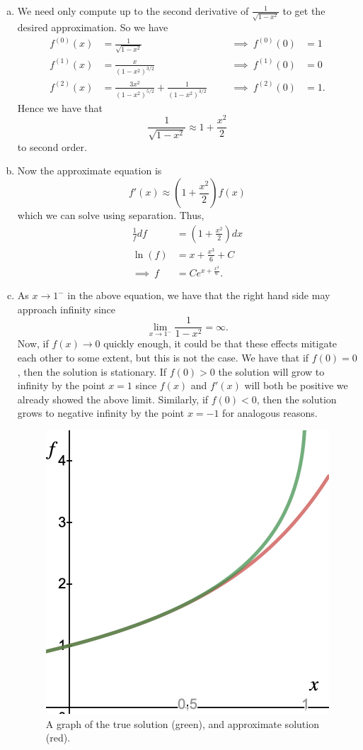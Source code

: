 \documentclass[12pt]{article} %
\begin{document}
\begin{solution}~
\begin{enumerate}[(a)]
    \item We need only compute up to the second derivative of $\frac{1}{\sqrt{1-x^2}}$ to get the desired approximation.  So we have
    \begin{align*}
        f^{(0)}(x)&= \frac{1}{\sqrt{1-x^2}} &&& \implies ~f^{(0)}(0)&=1\\
        f^{(1)}(x)&= \frac{x}{\left(1-x^2\right)^{3/2}} &&& \implies~ f^{(1)}(0)&=0\\
        f^{(2)}(x)&= \frac{3x^2}{\left(1-x^2\right)^{5/2}} + \frac{1}{\left(1-x^2\right)^{3/2}} &&& \implies ~f^{(2)}(0)&=1.
    \end{align*}
    Hence we have that
    \[
    \frac{1}{\sqrt{1-x^2}} \approx 1+\frac{x^2}{2}
    \]
    to second order.
    \item Now the approximate equation is
    \[
    f'(x)\approx \left(1+\frac{x^2}{2}\right)f(x)
    \]
    which we can solve using separation.  Thus,
    \begin{align*}
        \frac{1}{f}df&=\left(1+\frac{x^2}{2}\right)dx\\
        \ln(f)&= x+\frac{x^3}{6}+C\\
        \implies ~ f&= Ce^{x+\frac{x^3}{6}}.
    \end{align*}
    \item As $x\to 1^-$ in the above equation, we have that the right hand side may approach infinity since 
    \[
    \lim_{x\to 1^-} \frac{1}{1-x^2}=\infty.
    \]
    Now, if $f(x)\to 0$ quickly enough, it could be that these effects mitigate each other to some extent, but this is not the case.  We have that if $f(0)=0$, then the solution is stationary. If $f(0)>0$ the solution will grow to infinity by the point $x=1$ since $f(x)$ and $f'(x)$ will both be positive we already showed the above limit.  Similarly, if $f(0)<0$, then the solution grows to negative infinity by the point $x=-1$ for analogous reasons.  
    \begin{figure}[H]
        \centering
        \includegraphics[width=.5\textwidth]{desmos-graph.png}
        \caption{A graph of the true solution (green), and approximate solution (red).}
    \end{figure}
    \end{enumerate}
\end{solution}
\end{document}
